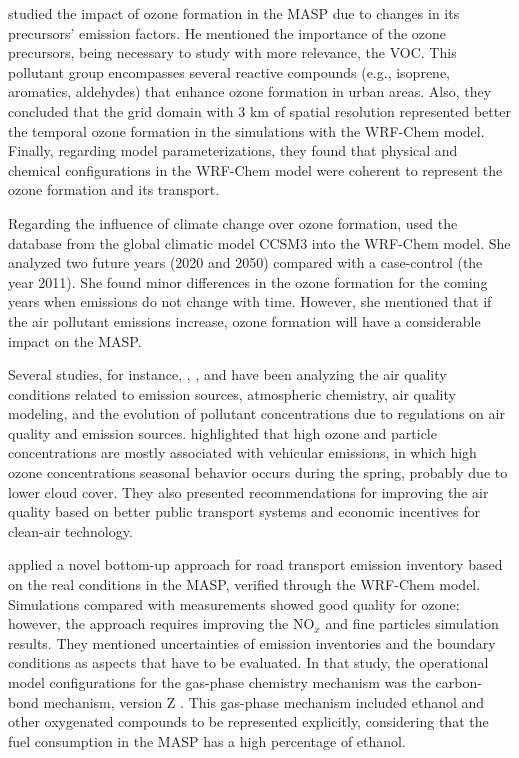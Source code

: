 \citet{Vara2013} studied the impact of ozone formation in the MASP due to changes in its precursors' emission factors.
He mentioned the importance of the ozone precursors, being necessary to study with more relevance, the VOC.
This pollutant group encompasses several reactive compounds (e.g., isoprene, aromatics, aldehydes) that enhance ozone formation in urban areas.
Also, they concluded that the grid domain with 3 km of spatial resolution represented better the temporal ozone formation in the simulations with the WRF-Chem model.
Finally, regarding model parameterizations, they found that physical and chemical configurations in the WRF-Chem model were coherent to represent the ozone formation and its transport. 

Regarding the influence of climate change over ozone formation, \citet{Mazzoli2013} used the database from the global climatic model CCSM3 into the WRF-Chem model.
She analyzed two future years (2020 and 2050) compared with a case-control (the year 2011). 
She found minor differences in the ozone formation for the coming years when emissions do not change with time. 
However, she mentioned that if the air pollutant emissions increase, ozone formation will have a considerable impact on the MASP.

Several studies, for instance, \citet{Carvalho2015}, \citet{Andrade2015}, and \citet{Andrade2017} have been analyzing the air quality conditions related to emission sources, atmospheric chemistry, air quality modeling, and the evolution of pollutant concentrations due to regulations on air quality and emission sources.
\citet{Carvalho2015} highlighted that high ozone and particle concentrations are mostly associated with vehicular emissions, in which high ozone concentrations seasonal behavior occurs during the spring, probably due to lower cloud cover. %
They also presented recommendations for improving the air quality based on better public transport systems and economic incentives for clean-air technology.

\citet{Andrade2015} applied a novel bottom-up approach for road transport emission inventory based on the real conditions in the MASP, verified through the WRF-Chem model.
Simulations compared with measurements showed good quality for ozone; however, the approach requires improving the NO$_x$ and fine particles simulation results.
They mentioned uncertainties of emission inventories and the boundary conditions as aspects that have to be evaluated.
In that study, the operational model configurations for the gas-phase chemistry mechanism was the carbon-bond mechanism, version Z \citep[CBM-Z;][]{Zaveri1999}.
This gas-phase mechanism included ethanol and other oxygenated compounds to be represented explicitly, considering that the fuel consumption in the MASP has a high percentage of ethanol.

